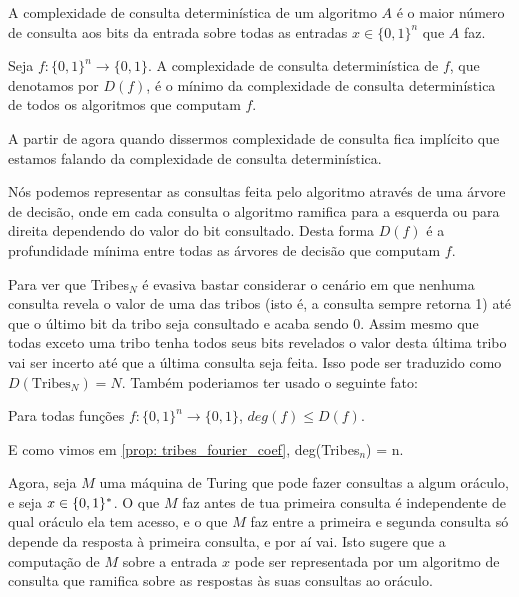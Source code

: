 \begin{defi}

A complexidade de consulta determinística de um algoritmo $A$ é o maior número de consulta aos bits da entrada sobre todas as entradas $x \in \{0, 1\}^{n}$ que $A$ faz.

Seja $f: \{0, 1\}^{n} \to \{0, 1\}$. A complexidade de consulta determinística de $f$, que denotamos por $D(f)$, é o mínimo da complexidade de consulta determinística de todos os algoritmos que computam $f$.

\end{defi}

A partir de agora quando dissermos complexidade de consulta fica implícito que estamos falando da complexidade de consulta determinística.

Nós podemos representar as consultas feita pelo algoritmo através de uma árvore de decisão, onde em cada consulta o algoritmo ramifica para a esquerda ou para direita dependendo do valor do bit consultado. Desta forma $D(f)$ é a profundidade mínima entre todas as árvores de decisão que computam $f$.

Para ver que Tribes$_{N}$ é evasiva bastar considerar o cenário em que nenhuma consulta revela o valor de uma das tribos (isto é, a consulta sempre retorna 1) até que o último bit da tribo seja consultado e acaba sendo 0. Assim mesmo que todas exceto uma tribo tenha todos seus bits revelados o valor desta última tribo vai ser incerto até que a última consulta seja feita. Isso pode ser traduzido como $D(\text{Tribes}_{N}) = N$. Também poderiamos ter usado o seguinte fato:

\begin{fato}
Para todas funções $f: \{0, 1\}^{n} \to \{0, 1\}$, $deg(f) \leq D(f)$.
\end{fato}

E como vimos em \ref{prop: tribes_fourier_coef}, deg(Tribes$_{n}$) = n.

Agora, seja $M$ uma máquina de Turing que pode fazer consultas a algum oráculo, e seja $x \in \{0, 1\}^{*}$. O que $M$ faz antes de tua primeira consulta é independente de qual oráculo ela tem acesso, e o que $M$ faz entre a primeira e segunda consulta só depende da resposta à primeira consulta, e por aí vai. Isto sugere que a computação de $M$ sobre a entrada $x$ pode ser representada por um algoritmo de consulta que ramifica sobre as respostas às suas consultas ao oráculo.

